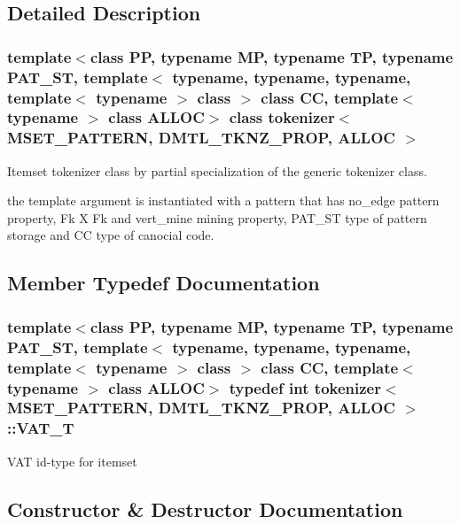 \subsection{Detailed Description}
\subsubsection*{template$<$class PP, typename MP, typename TP, typename PAT\_\-ST, template$<$ typename, typename, typename, template$<$ typename $>$ class $>$ class CC, template$<$ typename $>$ class ALLOC$>$ class tokenizer$<$ MSET\_\-PATTERN, DMTL\_\-TKNZ\_\-PROP, ALLOC $>$}

Itemset tokenizer class by partial specialization of the generic tokenizer class. 

the template argument is instantiated with a pattern that has no\_\-edge pattern property, Fk X Fk and vert\_\-mine mining property, PAT\_\-ST type of pattern storage and CC type of canocial code. 



\subsection{Member Typedef Documentation}
\subsubsection{\setlength{\rightskip}{0pt plus 5cm}template$<$class PP, typename MP, typename TP, typename PAT\_\-ST, template$<$ typename, typename, typename, template$<$ typename $>$ class $>$ class CC, template$<$ typename $>$ class ALLOC$>$ typedef int \bf{tokenizer}$<$ MSET\_\-PATTERN, DMTL\_\-TKNZ\_\-PROP, ALLOC $>$::\bf{VAT\_\-T}}\label{classtokenizer_3_01MSET__PATTERN_00_01DMTL__TKNZ__PROP_00_01ALLOC_01_4_6b23e5bd261d78a66610aa4b642b175b}


VAT id-type for itemset 

\subsection{Constructor \& Destructor Documentation}
